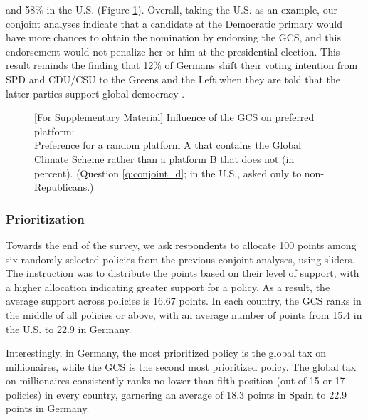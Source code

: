 and 58\% in the U.S. (Figure \ref{fig:conjoint_left_ag_b}). %
Overall, taking the U.S. as an example, our conjoint analyses indicate that a candidate at the Democratic primary would have more chances to obtain the nomination by endorsing the GCS, and this endorsement would not penalize her or him at the presidential election. This result reminds the finding that 12\% of Germans shift their voting intention from SPD and CDU/CSU to the Greens and the Left when they are told that the latter parties support global democracy \citep{ghassim_who_2020}.
\begin{figure}[h!]
    \caption[Influence of the GCS on preferred platform]{[For Supplementary Material] Influence of the GCS on preferred platform:\\ Preference for a random platform A that contains the Global Climate Scheme rather than a platform B that does not (in percent). (Question \ref{q:conjoint_d}; in the U.S., asked only to non-Republicans.)}\label{fig:conjoint_left_ag_b}
\end{figure}
\subsubsection{Prioritization}\label{subsubsec:prioritization} %

Towards the end of the survey, we ask respondents to allocate 100 points among six randomly selected policies from the previous conjoint analyses, using sliders. The instruction was to distribute the points based on their level of support, with a higher allocation indicating greater support for a policy. %
As a result, the average support across policies is 16.67 points. %
In each country, the GCS ranks in the middle of all policies or above, with an average number of points from 15.4 in the U.S. to 22.9 in Germany.%

Interestingly, in Germany, the most prioritized policy is the global tax on millionaires, while the GCS is the second most prioritized policy. The global tax on millionaires consistently ranks no lower than fifth position (out of 15 or 17 policies) in every country, garnering an average of 18.3 points in Spain to 22.9 points in Germany.

